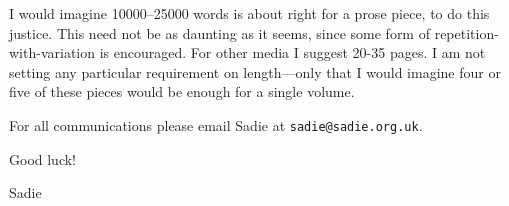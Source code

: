 \documentclass[a4paper]{article}
\begin{document}
I would imagine 10000--25000 words is about right for a prose piece, to
do this justice.  This need not be as daunting as it seems, since some
form of repetition-with-variation is encouraged.  For other media I
suggest 20-35 pages.  I am not setting any particular requirement on
length---only that I would imagine four or five of these pieces would
be enough for a single volume.

For all communications please email Sadie at \texttt{sadie@sadie.org.uk}.

Good luck!

\strut\hfill Sadie 
\end{document}
